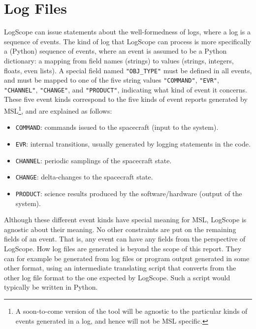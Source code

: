 \documentclass{report}
\newcommand{\python}{{\sc Python}}
\newcommand{\logscope}{{\sc LogScope}}
\begin{document}

\chapter{Log Files}
\label{sec:logfiles}

\logscope{} can issue statements about the well-formedness of logs, where a log is a sequence of events.  The kind of log that \logscope{} can process is  more specifically a (\python) sequence of events, where an event is assumed to be a \python{} dictionary: a mapping from field names (strings) to values (strings, integers, floats, even lists). A special field named {\tt "OBJ\_TYPE"} must be defined in all events, and must be mapped to
one of the five string values {\tt "COMMAND"}, {\tt "EVR"}, {\tt "CHANNEL"}, 
{\tt "CHANGE"}, and {\tt "PRODUCT"}, indicating what kind of event it concerns.
These five event kinds correspond to the five kinds of event reports generated by 
MSL\footnote{A soon-to-come version of the tool will be agnostic to the particular kinds of events generated in a log, and hence will not be MSL specific.}, and are explained as follows:

\begin{itemize}
  \item {\tt COMMAND}: commands issued to the spacecraft (input to the system).
  \item {\tt EVR}:  internal transitions, usually generated by logging statements in the code.
  \item {\tt CHANNEL}: periodic samplings of the spacecraft state.
  \item {\tt CHANGE}: delta-changes to the spacecraft state.
  \item {\tt PRODUCT}: science results produced by the software/hardware (output of the system).
\end{itemize}

\noindent
Although these different event kinds have special meaning for MSL, \logscope{} is agnostic about their meaning.
No other constraints are put on the remaining fields of an event. That is, any event can have any fields from the perspective of \logscope.
%
How log files are generated is beyond the scope of this report. They can for example be
generated from log files or program output generated in some other format, using an
intermediate translating script that converts from the other log file format to the one expected by \logscope{}. Such a script would typically be written in \python{}.
\end{document}
